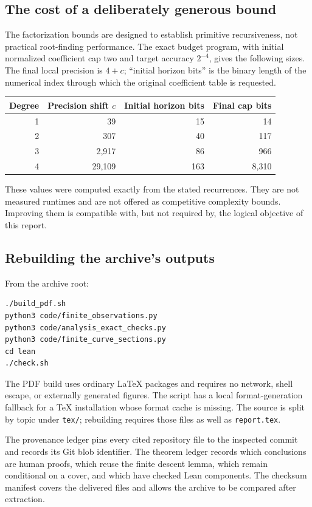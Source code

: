 \subsection{The cost of a deliberately generous bound}

The factorization bounds are designed to establish primitive
recursiveness, not practical root-finding performance. The exact budget
program, with initial normalized coefficient cap two and target accuracy
$2^{-4}$, gives the following sizes. The final local precision is $4+c$;
``initial horizon bits'' is the binary length of the numerical index
through which the original coefficient table is requested.
\begin{center}
\begin{tabular}{@{}rrrr@{}}
\toprule
Degree & Precision shift $c$ & Initial horizon bits & Final cap bits\\
\midrule
1 & 39 & 15 & 14\\
2 & 307 & 40 & 117\\
3 & 2,917 & 86 & 966\\
4 & 29,109 & 163 & 8,310\\
\bottomrule
\end{tabular}
\end{center}
These values were computed exactly from the stated recurrences. They
are not measured runtimes and are not offered as competitive complexity
bounds. Improving them is compatible with, but not required by, the
logical objective of this report.

\subsection{Rebuilding the archive's outputs}

From the archive root:
\begin{lstlisting}
./build_pdf.sh
python3 code/finite_observations.py
python3 code/analysis_exact_checks.py
python3 code/finite_curve_sections.py
cd lean
./check.sh
\end{lstlisting}
The PDF build uses ordinary LaTeX packages and requires no network,
shell escape, or externally generated figures. The script has a local
format-generation fallback for a TeX installation whose format cache is
missing. The source is split by topic under \texttt{tex/}; rebuilding
requires those files as well as \texttt{report.tex}.

The provenance ledger pins every cited repository file to the inspected
commit and records its Git blob identifier. The theorem ledger records
which conclusions are human proofs, which reuse the finite descent
lemma, which remain conditional on a cover, and which have checked Lean
components. The checksum manifest covers the delivered files and allows
the archive to be compared after extraction.

